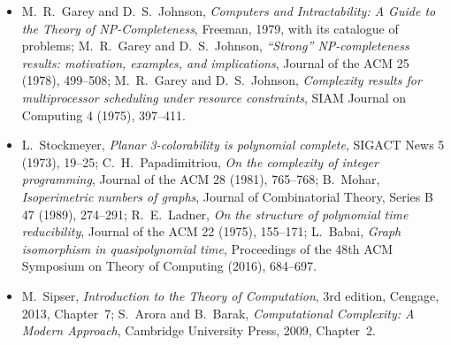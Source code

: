 \begin{itemize}
\item M.~R.~Garey and D.~S.~Johnson, \emph{Computers and Intractability: A Guide to the Theory of NP-Completeness}, Freeman, 1979, with its catalogue of problems; M.~R.~Garey and D.~S.~Johnson, \emph{``Strong'' NP-completeness results: motivation, examples, and implications}, Journal of the ACM 25 (1978), 499--508; M.~R.~Garey and D.~S.~Johnson, \emph{Complexity results for multiprocessor scheduling under resource constraints}, SIAM Journal on Computing 4 (1975), 397--411.
\item L.~Stockmeyer, \emph{Planar 3-colorability is polynomial complete}, SIGACT News 5 (1973), 19--25; C.~H.~Papadimitriou, \emph{On the complexity of integer programming}, Journal of the ACM 28 (1981), 765--768; B.~Mohar, \emph{Isoperimetric numbers of graphs}, Journal of Combinatorial Theory, Series B 47 (1989), 274--291; R.~E.~Ladner, \emph{On the structure of polynomial time reducibility}, Journal of the ACM 22 (1975), 155--171; L.~Babai, \emph{Graph isomorphism in quasipolynomial time}, Proceedings of the 48th ACM Symposium on Theory of Computing (2016), 684--697.
\item M.~Sipser, \emph{Introduction to the Theory of Computation}, 3rd edition, Cengage, 2013, Chapter~7; S.~Arora and B.~Barak, \emph{Computational Complexity: A Modern Approach}, Cambridge University Press, 2009, Chapter~2.
\end{itemize}

